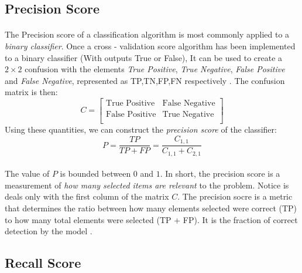 \documentclass[12pt,letterpaper]{article}
\begin{document}

\subsection{Precision Score}
\paragraph*{}The Precision score of a classification algorithm is most commonly applied to a \textit{binary classifier}. Once a cross - validation score algorithm has been implemented to a binary classifier (With outputs \textsf{True} or \textsf{False}), It can be used to create a $2 \times 2$ confusion with the elements \textit{True Positive}, \textit{True Negative}, \textit{False Positive} and \textit{False Negative}, represented as TP,TN,FP,FN respectively \cite{Gareth}. The confusion matrix is then:
\begin{equation}
C = 
\begin{bmatrix}
\text{True Positive} & \text{False Negative} \\
\text{False Positive} & \text{True Negative} \\
\end{bmatrix}
\end{equation}
Using these quantities, we can construct the \textit{precision score} of the classifier:
\begin{equation}
\label{precsision score}
P = \frac{TP}{TP + FP} = \frac{C_{1,1}}{C_{1,1}+C_{2,1}}
\end{equation}
\paragraph*{}The value of $P$ is bounded between $0$ and $1$. In short, the precision score is a measurement of \textit{how many selected items are relevant} to the problem. Notice is deals only with the first column of the matrix $C$. The precision socre is a metric that determines the ratio between how many elements selected were correct (TP) to how many total elements were selected (TP + FP). It is the fraction of correct detection by the model \cite{Goodfellow}. 


\subsection{Recall Score}
\end{document}
